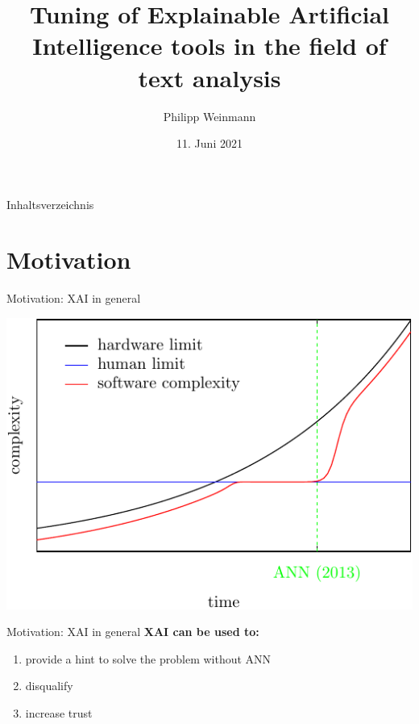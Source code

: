 \documentclass[en]{sdqbeamer}
\title[Tuning of XAI tools]{Tuning of Explainable Artificial Intelligence tools in the field of text analysis}
\author[Philipp Weinmann]{Philipp Weinmann}
\date[11.\,06.\,2021]{11. Juni 2021}
\begin{document}
\KITtitleframe


\begin{frame}{Inhaltsverzeichnis}
\tableofcontents
\end{frame}

\section{Motivation}

\begin{large}

\begin{frame}{Motivation: XAI in general}
\begin{center}
\includegraphics[width=0.5\linewidth]{images/Complexity.pdf}\\
\end{center}
\end{frame}


\begin{frame}{Motivation: XAI in general}
\textbf{XAI can be used to:} 
\begin{enumerate}
    \item provide a hint to solve the problem without ANN
    \pause
    \item disqualify
    \pause
    \item increase trust
\end{enumerate}
\end{frame}



\end{large}
\end{document}
